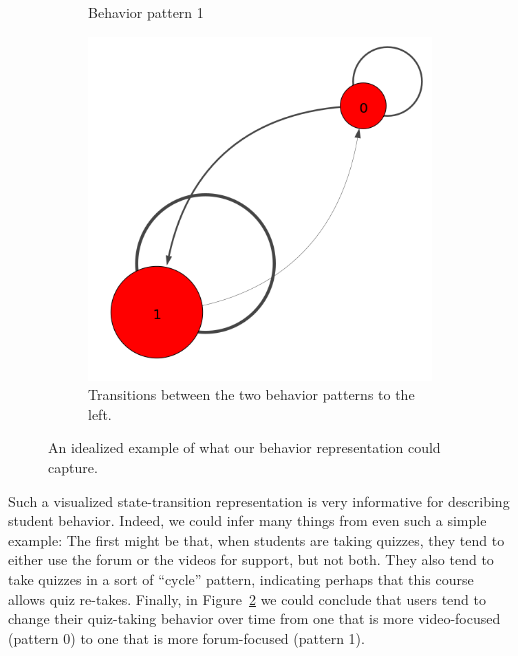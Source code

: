 \begin{figure}
\begin{subfigure}[t]{0.30\textwidth}
    \caption{Behavior pattern 1\label{fig:motivating-example-1}}
  \end{subfigure}
  \begin{subfigure}[t]{0.30\textwidth}
    \includegraphics[width=\textwidth]{figures/example/trans.png}
    \caption{Transitions between the two behavior patterns to the
    left.\label{fig:motivating-example-trans}}
  \end{subfigure}
  \caption{An idealized example of what our behavior representation could capture.}
  \label{fig:motivating-example}
\end{figure}
Such a visualized state-transition representation is very informative for describing student behavior. Indeed, we could infer many things from even such a simple example: The first might
be that, when students are taking quizzes, they tend to either use the
forum or the videos for support, but not both. They also tend to take
quizzes in a sort of ``cycle'' pattern, indicating perhaps that this course
allows quiz re-takes. Finally, in Figure~\ref{fig:motivating-example-trans}
we could conclude that users tend to change their quiz-taking behavior over
time from one that is more video-focused (pattern 0) to one that is more
forum-focused (pattern 1).

